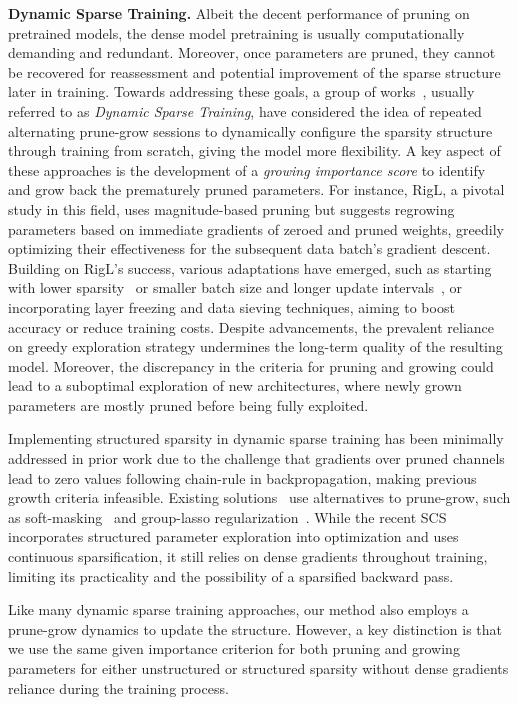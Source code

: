 \noindent\textbf{Dynamic Sparse Training.}
Albeit the decent performance of pruning on pretrained models, the dense model pretraining is usually computationally demanding and redundant. Moreover, once parameters are pruned, they cannot be recovered for reassessment and potential improvement of the sparse structure later in training. Towards addressing these goals,  a group of works~\cite{mocanu2018scalable, dettmers2019sparse, mostafa2019parameter, kusupati2020soft, wortsman2019discovering, dai2019nest, evci2020rigging, lin2020dynamic, ma2021effective, yuan2020growing, liusw2021sparse, yuan2021mest, liu2021we, yuan2022layer, hou2022chex, lasby2023dynamic}, usually referred to as \textit{Dynamic Sparse Training}, have considered the idea of repeated alternating prune-grow sessions to dynamically configure the sparsity structure through training from scratch, giving the model more flexibility. A key aspect of these approaches is the development of a \emph{growing importance score} to identify and grow back the prematurely pruned parameters. For instance, RigL, a pivotal study in this field, uses magnitude-based pruning but suggests regrowing parameters based on immediate gradients of zeroed and pruned weights, greedily optimizing their effectiveness for the subsequent data batch's gradient descent. Building on RigL's success, various adaptations have emerged, such as starting with lower sparsity~\cite{liusw2021sparse} or smaller batch size and longer update intervals~\cite{liu2021we}, or incorporating layer freezing and data sieving techniques\cite{yuan2021mest, yuan2022layer}, aiming to boost accuracy or reduce training costs. Despite advancements, the prevalent reliance on greedy exploration strategy undermines the long-term quality of the resulting model. Moreover, the discrepancy in the criteria for pruning and growing could lead to a suboptimal exploration of new architectures, where newly grown parameters are mostly pruned before being fully exploited.

Implementing structured sparsity in dynamic sparse training has been minimally addressed in prior work due to the challenge that gradients over pruned channels lead to zero values following chain-rule in backpropagation, making previous growth criteria infeasible. Existing solutions~\cite{he2018soft, kang2020operation, lym2019prunetrain, yuan2020growing, lasby2023dynamic} use alternatives to prune-grow, such as soft-masking~\cite{he2018soft, kang2020operation} and group-lasso regularization~\cite{lym2019prunetrain}. While the recent SCS~\cite{yuan2020growing} incorporates structured parameter exploration into optimization and uses continuous sparsification, it still relies on dense gradients throughout training, limiting its practicality and the possibility of a sparsified backward pass.

Like many dynamic sparse training approaches, our method also employs a prune-grow dynamics to update the structure. However, a key distinction is that we use the same given importance criterion for both pruning and growing parameters for either unstructured or structured sparsity without dense gradients reliance during the training process.